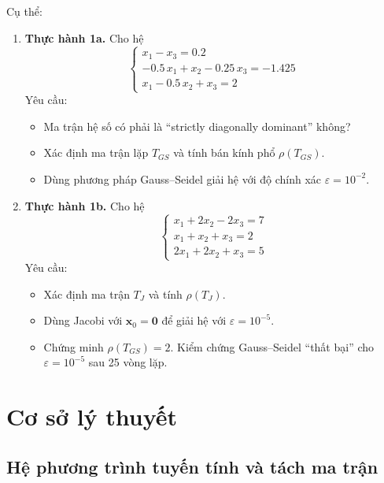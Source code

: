 \documentclass[12pt,a4paper]{article}
\begin{document}
Cụ thể:
\begin{enumerate}
    \item \textbf{Thực hành 1a.} Cho hệ
    \[
        \begin{cases}
            x_1 - x_3 = 0.2 \\
            -0.5\,x_1 + x_2 - 0.25\,x_3 = -1.425 \\
            x_1 - 0.5\,x_2 + x_3 = 2
        \end{cases}
    \]
    Yêu cầu:
    \begin{itemize}[leftmargin=2em]
        \item Ma trận hệ số có phải là ``strictly diagonally dominant'' không?
        \item Xác định ma trận lặp $T_{GS}$ và tính bán kính phổ $\rho(T_{GS})$.
        \item Dùng phương pháp Gauss--Seidel giải hệ với độ chính xác $\varepsilon = 10^{-2}$.
    \end{itemize}

    \item \textbf{Thực hành 1b.} Cho hệ
    \[
        \begin{cases}
            x_1 + 2x_2 - 2x_3 = 7 \\
            x_1 + x_2 + x_3 = 2 \\
            2x_1 + 2x_2 + x_3 = 5
        \end{cases}
    \]
    Yêu cầu:
    \begin{itemize}[leftmargin=2em]
        \item Xác định ma trận $T_J$ và tính $\rho(T_J)$.
        \item Dùng Jacobi với $\mathbf{x}_0 = \mathbf{0}$ để giải hệ với $\varepsilon = 10^{-5}$.
        \item Chứng minh $\rho(T_{GS}) = 2$. Kiểm chứng Gauss--Seidel ``thất bại'' cho $\varepsilon = 10^{-5}$ sau 25 vòng lặp.
    \end{itemize}
\end{enumerate}


\section{Cơ sở lý thuyết}

\subsection{Hệ phương trình tuyến tính và tách ma trận}
\end{document}
